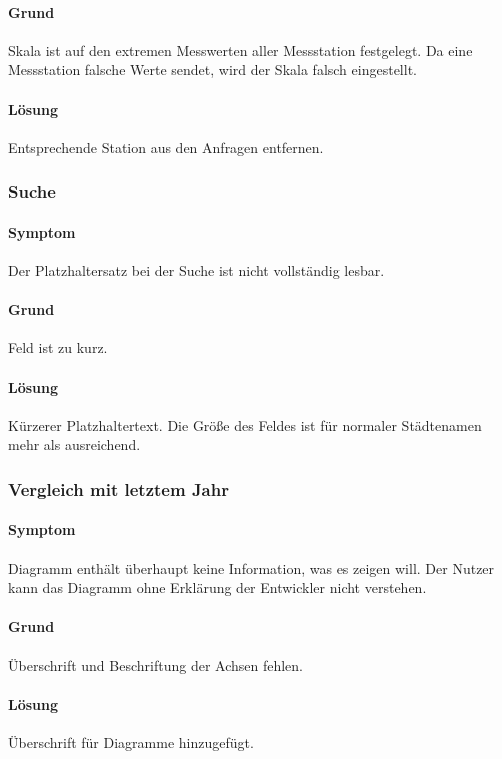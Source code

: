 \paragraph{Grund}
Skala ist auf den extremen Messwerten aller Messstation festgelegt. 
Da eine Messstation falsche Werte sendet, wird der Skala falsch eingestellt. 

\paragraph{Lösung}
Entsprechende Station aus den Anfragen entfernen.

\subsubsection{Suche}
\paragraph{Symptom}
Der Platzhaltersatz bei der Suche ist nicht vollständig lesbar.

\paragraph{Grund}
Feld  ist zu kurz.

\paragraph{Lösung}
Kürzerer Platzhaltertext. Die Größe des Feldes ist für normaler Städtenamen mehr als ausreichend.

\subsubsection{Vergleich mit letztem Jahr}
\paragraph{Symptom}

Diagramm enthält überhaupt keine Information, was es zeigen will. Der Nutzer kann das Diagramm ohne Erklärung der Entwickler nicht verstehen.


\paragraph{Grund}
Überschrift und Beschriftung der Achsen fehlen.

\paragraph{Lösung}
Überschrift für Diagramme hinzugefügt.

